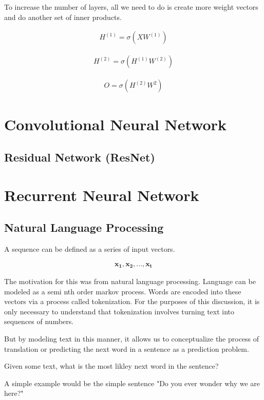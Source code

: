 \documentclass{article}
\begin{document}
To increase the number of layers, all we need to do is create more weight vectors and do another set of inner products.

\begin{align*}
H^{(1)} = \sigma(XW^{(1)}) 
\end{align*}

\begin{align*}
H^{(2)} = \sigma(H^{(1)}W^{(2)})
\end{align*}

\begin{align*}
O = \sigma(H^{(2)}W^{2}) 
\end{align*}


\section{Convolutional Neural Network}

\subsection{Residual Network (ResNet)}

\section{Recurrent Neural Network}
\subsection{Natural Language Processing}
A sequence can be defined as a series of input vectors.

\begin{align*}
\mathbf{x_1}, \mathbf{x_2}, ... , \mathbf{x_t}
\end{align*}

The motivation for this was from natural language processing. Language can be modeled as a semi nth order markov process. Words are encoded into these vectors via a process called tokenization. For the purposes of this discussion, it is only necessary to understand that tokenization involves turning text into sequences of numbers.

But by modeling text in this manner, it allows us to conceptualize the process of translation or predicting the next word in a sentence as a prediction problem.

Given some text, what is the most likley next word in the sentence?

A simple example would be the simple sentence "Do you ever wonder why we are here?"
\end{document}
